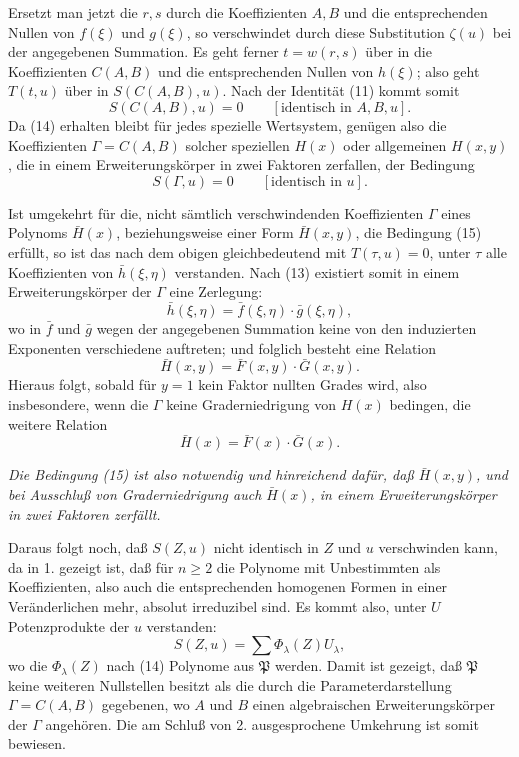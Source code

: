 \documentclass[11pt]{article}
\begin{document}
Ersetzt man jetzt die $r,s$ durch die Koeffizienten $A,B$ und die entsprechenden Nullen von $f(\xi)$ und $g(\xi)$, so verschwindet durch diese Substitution $\zeta(u)$ bei der angegebenen Summation. Es geht ferner $t=w(r,s)$ über in die Koeffizienten $C(A,B)$ und die entsprechenden Nullen von $h(\xi)$; also geht $T(t,u)$ über in $S(C(A,B),u)$. Nach der Identität (11) kommt somit
\begin{equation}
 S(C(A,B),u)=0\qquad[\text{identisch in }A,B,u].
\tag{14}
\end{equation}
Da (14) erhalten bleibt für jedes spezielle Wertsystem, genügen also die Koeffizienten $\Gamma=C(A,B)$ solcher speziellen $H(x)$ oder allgemeinen $H(x,y)$, die in einem Erweiterungskörper in zwei Faktoren zerfallen, der Bedingung
\begin{equation}
 S(\Gamma,u)=0\qquad[\text{identisch in }u].
\tag{15}
\end{equation}

Ist umgekehrt für die, nicht sämtlich verschwindenden Koeffizienten $\Gamma$ eines Polynoms $\bar H(x)$, beziehungsweise einer Form $\bar H(x,y)$, die Bedingung (15) erfüllt, so ist das nach dem obigen gleichbedeutend mit $T(\tau,u)=0$, unter $\tau$ alle Koeffizienten von $\bar h(\xi,\eta)$ verstanden. Nach (13) existiert somit in einem Erweiterungskörper der $\Gamma$ eine Zerlegung:
\[
 \bar h(\xi,\eta)=\bar f(\xi,\eta)\cdot\bar g(\xi,\eta),
\]
wo in $\bar f$ und $\bar g$ wegen der angegebenen Summation keine von den induzierten Exponenten verschiedene auftreten; und folglich besteht eine Relation
\[
 \bar H(x,y)=\bar F(x,y)\cdot\bar G(x,y).
\]
Hieraus folgt, sobald für $y=1$ kein Faktor nullten Grades wird, also insbesondere, wenn die $\Gamma$ keine Graderniedrigung von $H(x)$ bedingen, die weitere Relation
\[
 \bar H(x)=\bar F(x)\cdot\bar G(x).
\]

\emph{Die Bedingung (15) ist also notwendig und hinreichend dafür, daß $\bar H(x,y)$, und bei Ausschluß von Graderniedrigung auch $\bar H(x)$, in einem Erweiterungskörper in zwei Faktoren zerfällt.}

Daraus folgt noch, daß $S(Z,u)$ nicht identisch in $Z$ und $u$ verschwinden kann, da in 1. gezeigt ist, daß für $n\ge2$ die Polynome mit Unbestimmten als Koeffizienten, also auch die entsprechenden homogenen Formen in einer Veränderlichen mehr, absolut irreduzibel sind. Es kommt also, unter $U$ Potenzprodukte der $u$ verstanden:
\[
 S(Z,u)=\sum \Phi_\lambda(Z)U_\lambda,
\]
wo die $\Phi_\lambda(Z)$ nach (14) Polynome aus $\mathfrak P$ werden. Damit ist gezeigt, daß $\mathfrak P$ keine weiteren Nullstellen besitzt als die durch die Parameterdarstellung $\Gamma=C(A,B)$ gegebenen, wo $A$ und $B$ einen algebraischen Erweiterungskörper der $\Gamma$ angehören. Die am Schluß von 2. ausgesprochene Umkehrung ist somit bewiesen.
\end{document}
